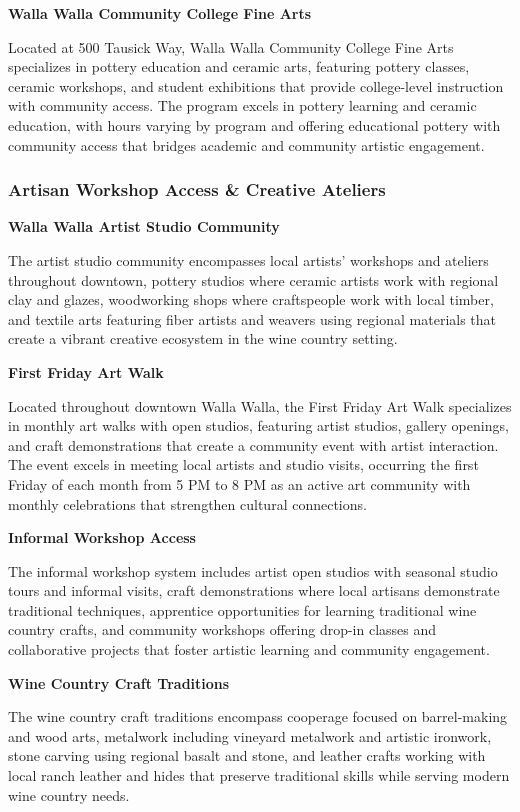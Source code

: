 \documentclass[
  11pt,
  letterpaper,
  DIV=10,
  numbers=noendperiod]{scrartcl}
\begin{document}
\textbf{Walla Walla Community College Fine Arts}

Located at 500 Tausick Way, Walla Walla Community College Fine Arts
specializes in pottery education and ceramic arts, featuring pottery
classes, ceramic workshops, and student exhibitions that provide
college-level instruction with community access. The program excels in
pottery learning and ceramic education, with hours varying by program
and offering educational pottery with community access that bridges
academic and community artistic engagement.

\subsubsection{Artisan Workshop Access \& Creative
Ateliers}\label{artisan-workshop-access-creative-ateliers-2}

\textbf{Walla Walla Artist Studio Community}

The artist studio community encompasses local artists' workshops and
ateliers throughout downtown, pottery studios where ceramic artists work
with regional clay and glazes, woodworking shops where craftspeople work
with local timber, and textile arts featuring fiber artists and weavers
using regional materials that create a vibrant creative ecosystem in the
wine country setting.

\textbf{First Friday Art Walk}

Located throughout downtown Walla Walla, the First Friday Art Walk
specializes in monthly art walks with open studios, featuring artist
studios, gallery openings, and craft demonstrations that create a
community event with artist interaction. The event excels in meeting
local artists and studio visits, occurring the first Friday of each
month from 5 PM to 8 PM as an active art community with monthly
celebrations that strengthen cultural connections.

\textbf{Informal Workshop Access}

The informal workshop system includes artist open studios with seasonal
studio tours and informal visits, craft demonstrations where local
artisans demonstrate traditional techniques, apprentice opportunities
for learning traditional wine country crafts, and community workshops
offering drop-in classes and collaborative projects that foster artistic
learning and community engagement.

\textbf{Wine Country Craft Traditions}

The wine country craft traditions encompass cooperage focused on
barrel-making and wood arts, metalwork including vineyard metalwork and
artistic ironwork, stone carving using regional basalt and stone, and
leather crafts working with local ranch leather and hides that preserve
traditional skills while serving modern wine country needs.
\end{document}
